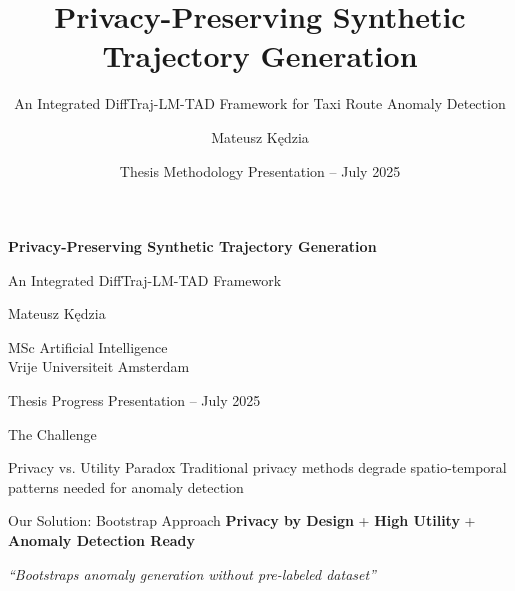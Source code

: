 \documentclass[aspectratio=169,xcolor={dvipsnames}]{beamer}
\title{Privacy-Preserving Synthetic Trajectory Generation}
\subtitle{An Integrated DiffTraj-LM-TAD Framework for Taxi Route Anomaly Detection}
\author{Mateusz Kędzia}
\institute{MSc AI \\ VUA / BJUT}
\date{Thesis Methodology Presentation -- July 2025}
\begin{document}
\begin{frame}[plain]
  \vspace{1.5cm}
  \centering
  {\color{VUBlue}\Huge\textbf{Privacy-Preserving Synthetic Trajectory Generation}}
  
  \vspace{0.5em}
  {\color{RichGold}\Large An Integrated DiffTraj-LM-TAD Framework}
  
  \vspace{1.5em}
  {\large Mateusz Kędzia}
  
  \vspace{0.5em}
  {\normalsize MSc Artificial Intelligence \\ Vrije Universiteit Amsterdam}
  
  \vspace{1em}
  {\small Thesis Progress Presentation -- July 2025}
\end{frame}

\begin{frame}{The Challenge}
  \begin{alertblock}{Privacy vs. Utility Paradox}
    \centering
    \Large Traditional privacy methods degrade spatio-temporal patterns needed for anomaly detection \cite{buchholzSystematisationKnowledgeTrajectory2024}
  \end{alertblock}
  
  \vspace{1em}
  \begin{block}{Our Solution: Bootstrap Approach}
    \centering
    \textbf{Privacy by Design} + \textbf{High Utility} + \textbf{Anomaly Detection Ready}
    
    \vspace{0.5em}
    \textit{``Bootstraps anomaly generation without pre-labeled dataset''}
  \end{block}
\end{frame}
\end{document}
